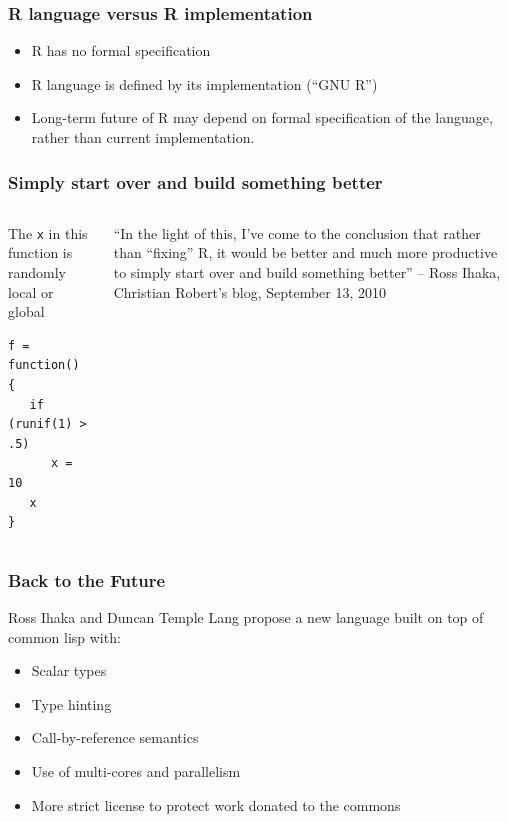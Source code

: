 \documentclass[svgnames]{beamer}
\begin{document}
\begin{frame}
  \frametitle{R language versus R implementation}

  \begin{itemize}
  \item R has no formal specification
  \item R language is defined by its implementation (``GNU R'')
  \item Long-term future of R may depend on formal specification of
    the language, rather than current implementation.
  \end{itemize}

\end{frame}

\begin{frame}[fragile]
  \frametitle{Simply start over and build something better}

  \begin{columns}
    \begin{column}{4cm}
      The {\tt x} in this function is randomly local or global
\begin{verbatim}
f = function() {
   if (runif(1) > .5) 
      x = 10
   x
}
\end{verbatim}
    \end{column}
    \begin{column}{6cm}
    ``In the light of this, I've come to the conclusion that rather
    than ``fixing'' R, it would be better and much more productive to
    simply start over and build something better'' -- Ross Ihaka,
    Christian Robert's blog, September 13, 2010
    \end{column}
  \end{columns}

\end{frame}

\begin{frame}
  \frametitle{Back to the Future}

  Ross Ihaka and Duncan Temple Lang propose a new language built on
  top of common lisp with:
  \begin{itemize}
  \item Scalar types
  \item Type hinting
  \item Call-by-reference semantics
  \item Use of multi-cores and parallelism
  \item More strict license to protect work donated to the commons
  \end{itemize}

\end{frame}
    
\end{document}
